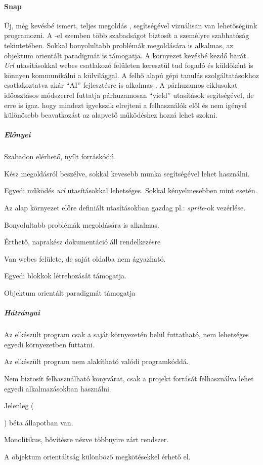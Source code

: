 \documentclass[12pt,a4paper,oneside]{report} %
\begin{document}
\paragraph{Snap} \label{snap}Új, még kevésbé  ismert, teljes megoldás \cite{harvey2013snap}, segítségével vizuálisan van lehetőségünk programozni. A -el szemben több szabadságot biztosít a személyre szabhatóság tekintetében. Sokkal bonyolultabb problémák megoldására is alkalmas, az objektum orientált paradigmát is támogatja. A környezet kevésbé kezdő barát. \textit{Url} utasításokkal webes  csatlakozó felületen keresztül tud fogadó és küldőként is könnyen kommunikálni a külvilággal. A felhő alapú gépi tanulás szolgáltatásokhoz csatlakoztatva akár ``AI'' fejlesztésre is alkalmas \cite{kahn2018ai}. A párhuzamos ciklusokat időosztásos módszerrel futtatja párhuzamosan ``yield'' utasítások segítségével, de erre is igaz. hogy mindezt igyekszik elrejteni a felhasználók elől és nem igényel különösebb beavatkozást az alapvető működéshez hozzá lehet szokni.
\subparagraph{Előnyei} 
\begin{compactitem}
	\item Szabadon elérhető, nyílt forráskódú.
	\item Kész megoldásról beszélve, sokkal kevesebb munka segítségével lehet használni.
	\item Egyedi működés \textit{url} utasításokkal lehetséges. Sokkal kényelmesebben mint  esetén.
	\item Az alap környezet előre definiált utasításokban gazdag pl.: \textit{sprite}-ok vezérlése.
	\item Bonyolultabb problémák megoldására is alkalmas.
	\item Érthető, naprakész dokumentáció áll rendelkezésre
	\item Van webes felülete, de saját oldalba nem ágyazható.
	\item Egyedi blokkok létrehozását támogatja.
	\item Objektum orientált paradigmát támogatja
\end{compactitem}
\subparagraph{Hátrányai} 
\begin{compactitem}
	\item Az elkészült program csak a saját környezetén belül futtatható, nem lehetséges egyedi környezetben futtatni.
	\item Az elkészült program nem alakítható valódi programkóddá.
	\item Nem biztosít felhasználható könyvárat, csak a projekt forrását felhasználva lehet egyedi alkalmazásokban használni.
	\item Jelenleg (\date{\today}) béta állapotban van.
	\item Monolitikus, bővítésre nézve többnyire zárt rendszer.
	\item A objektum orientáltság különböző megkötésekkel érhető el.
\end{compactitem}
\end{document}
